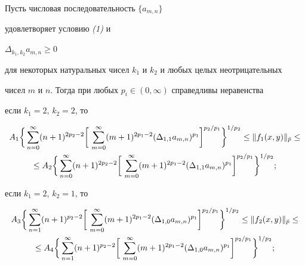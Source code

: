 \begin{thmnonum} Пусть числовая последовательность $\{a_{m,n}\}$ 


удовлетворяет условию {\em (1)} и\linebreak




$\Delta_{k_1,k_2}a_{m,n}\ge 0$ 


для некоторых натуральных чисел $k_1$ и $k_2$ и любых целых неотрицательных 


чисел $m$ и $n$. Тогда при любых $p_i\in(0,\infty)$ справедливы неравенства 


 


 если $k_1=2$, $k_2=2$, то 


\begin{multline*} 


A_1\biggl\{\,\sum^\infty_{n=0}(n+1)^{2p_2-2}\biggr[\, 


\sum^\infty_{m=0}(m+1)^{2p_1-2}(\Delta_{1,1}a_{m,n})^{p_1} 


\biggr]^{p_2/p_1}\biggr\}^{1/p_2} \le \|f_1(x,y)\|_{\Bar p} \le \\ 


% 


\le A_2\biggl\{\,\sum^\infty_{n=0}(n+1)^{2p_2-2}\biggr[\, 


\sum^\infty_{m=0}(m+1)^{2p_1-2}(\Delta_{1,1}a_{m,n})^{p_1} 


\biggr]^{p_2/p_1}\biggr\}^{1/p_2};


\end{multline*} 


 если $k_1=2$, $k_2=1$, то 


\begin{multline*} 


A_3\biggl\{\,\sum^\infty_{n=1}(n+1)^{p_2-2}\biggr[\, 


\sum^\infty_{m=0}(m+1)^{2p_1-2}(\Delta_{1,0}a_{m,n})^{p_1} 


\biggr]^{p_2/p_1}\biggr\}^{1/p_2} \le \|f_2(x,y)\|_{\Bar p} \le \\ 


% 


\le A_4\biggl\{\,\sum^\infty_{n=1}(n+1)^{p_2-2}\biggr[\, 


\sum^\infty_{m=0}(m+1)^{2p_1-2}(\Delta_{1,0}a_{m,n})^{p_1} 


\biggr]^{p_2/p_1}\biggr\}^{1/p_2};


\end{multline*} 



\end{thmnonum}
